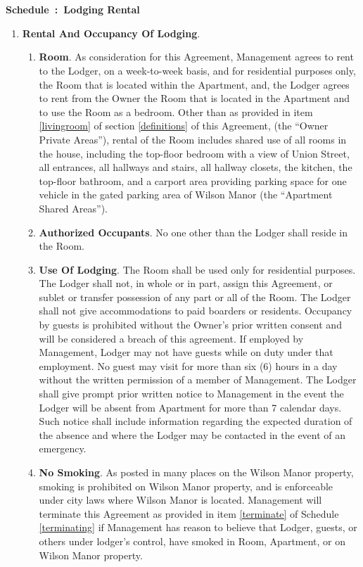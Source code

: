 \documentclass[]{article}
\newcounter{schedulecounter}
\renewcommand{\theschedulecounter}{\Alph{schedulecounter}}
\newenvironment{schedule}[1] {%
	\refstepcounter{schedulecounter}%
	\noindent \textbf{\Large Schedule~\theschedulecounter:~{#1}}
	\noindent
}{}
\newcommand{\therental}{Lodging Rental}
\newcommand{\management}{Management}
\newcommand{\condo}{Wilson Manor}
\newcommand{\apt}{Apartment}
\newcommand{\room}{Room}
\newcommand{\shared}{Apartment Shared Areas}
\newcommand{\livingroom}{Owner Private Areas}
\begin{document}
\section*{} %
\begin{schedule}{\therental{}} \label{therental}
\begin{enumerate}
	\item \textbf{Rental And Occupancy Of Lodging}. 
		\begin{enumerate}
			\item \textbf{Room}.
				As consideration for this Agreement, \management{} agrees to rent to the Lodger, on a week-to-week basis, and for residential purposes only, the \room{} that is located within the \apt{}, and, the Lodger agrees to rent from the Owner the \room{} that is located in the \apt{} and to use the \room{} as a bedroom.  Other than as provided in item \ref{livingroom} of section \ref{definitions} of this Agreement, (the ``\livingroom{}''), rental of the \room{} includes shared use of all rooms in the house, including the top-floor bedroom with a view of Union Street, all entrances, all hallways and stairs, all hallway closets, the kitchen, the top-floor bathroom, and a carport area providing parking space for one vehicle in the gated parking area of \condo{} (the ``\shared{}'').
			\item \textbf{Authorized Occupants}. No one other than the Lodger shall reside in the \room{}. 
			\item \textbf{Use Of Lodging}. The \room{} shall be used only for residential purposes. The Lodger shall not, in whole or in part, assign this Agreement, or sublet or transfer possession of any part or all of the \room{}. The Lodger shall not give accommodations to paid boarders or residents. Occupancy by guests is prohibited without the Owner's prior written consent and will be considered a breach of this agreement. If employed by \management{}, Lodger may not have guests while on duty under that employment. No guest may visit for more than six (6) hours in a day without the written permission of a member of \management{}. The Lodger shall give prompt prior written notice to \management{} in the event the Lodger will be absent from \apt{} for more than 7 calendar days. Such notice shall include information regarding the expected duration of the absence and where the Lodger may be contacted in the event of an emergency. 
			\item \textbf{No Smoking}. \label{smoking}
				As posted in many places on the \condo{} property, smoking is prohibited on \condo{} property, and is enforceable under city laws where \condo{} is located. \management{} will terminate this Agreement as provided in item \ref{terminate} of Schedule \ref{terminating} if \management{} has reason to believe that Lodger, guests, or others under lodger's control, have smoked in \room{}, \apt{}, or on \condo{} property.

\end{enumerate}
\end{enumerate}
\end{schedule}
\end{document}
